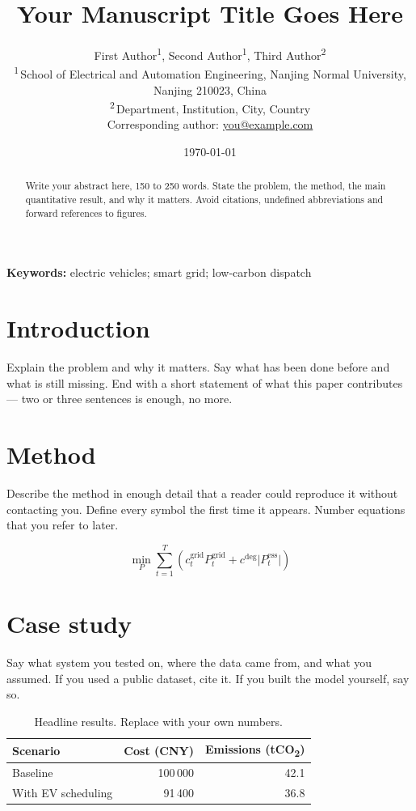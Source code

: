 \documentclass[11pt,a4paper]{article}
\title{\bfseries Your Manuscript Title Goes Here}
\author{%
  First Author\textsuperscript{1},
  Second Author\textsuperscript{1},
  Third Author\textsuperscript{2}
  \\[6pt]
  \small\textsuperscript{1}\,School of Electrical and Automation Engineering,
  Nanjing Normal University, Nanjing 210023, China
  \\[2pt]
  \small\textsuperscript{2}\,Department, Institution, City, Country
  \\[6pt]
  \small Corresponding author: \href{mailto:you@example.com}{you@example.com}
}
\date{\today}
\begin{document}
\maketitle

\begin{abstract}
\noindent
Write your abstract here, 150 to 250 words. State the problem, the method, the
main quantitative result, and why it matters. Avoid citations, undefined
abbreviations and forward references to figures.
\end{abstract}

\noindent\textbf{Keywords:} electric vehicles; smart grid; low-carbon dispatch

\section{Introduction}

Explain the problem and why it matters. Say what has been done before and what
is still missing. End with a short statement of what this paper contributes ---
two or three sentences is enough, no more.

\section{Method}

Describe the method in enough detail that a reader could reproduce it without
contacting you. Define every symbol the first time it appears. Number equations
that you refer to later.

\begin{equation}
  \min_{P} \sum_{t=1}^{T} \left( c_t^{\mathrm{grid}} P_t^{\mathrm{grid}}
  + c^{\mathrm{deg}} \lvert P_t^{\mathrm{ess}} \rvert \right)
  \label{eq:objective}
\end{equation}

\section{Case study}

Say what system you tested on, where the data came from, and what you assumed.
If you used a public dataset, cite it. If you built the model yourself, say so.

\begin{table}[htbp]
  \centering
  \caption{Headline results. Replace with your own numbers.}
  \label{tab:results}
  \begin{tabular}{lrr}
    \toprule
    Scenario & Cost (CNY) & Emissions (tCO\textsubscript{2}) \\
    \midrule
    Baseline            & 100\,000 & 42.1 \\
    With EV scheduling  &  91\,400 & 36.8 \\
    \bottomrule
  \end{tabular}
\end{table}
\end{document}
